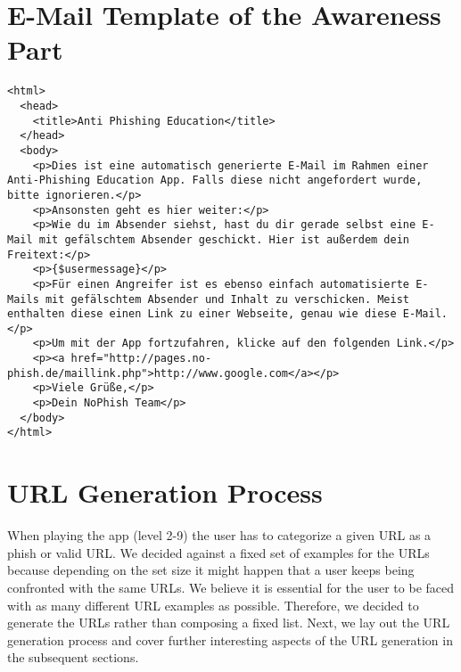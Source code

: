 \section{E-Mail Template of the Awareness Part}
\label{a:mail}
\lstset{language=html}
\begin{lstlisting}
<html>
  <head>
    <title>Anti Phishing Education</title>
  </head>
  <body>
    <p>Dies ist eine automatisch generierte E-Mail im Rahmen einer Anti-Phishing Education App. Falls diese nicht angefordert wurde, bitte ignorieren.</p>
    <p>Ansonsten geht es hier weiter:</p>
    <p>Wie du im Absender siehst, hast du dir gerade selbst eine E-Mail mit gefälschtem Absender geschickt. Hier ist außerdem dein Freitext:</p>
    <p>{$usermessage}</p>
    <p>Für einen Angreifer ist es ebenso einfach automatisierte E-Mails mit gefälschtem Absender und Inhalt zu verschicken. Meist enthalten diese einen Link zu einer Webseite, genau wie diese E-Mail.</p>
    <p>Um mit der App fortzufahren, klicke auf den folgenden Link.</p>
    <p><a href="http://pages.no-phish.de/maillink.php">http://www.google.com</a></p>
    <p>Viele Grüße,</p>
    <p>Dein NoPhish Team</p>
  </body>
</html>
\end{lstlisting}

\section{URL Generation Process}
\label{s:url_generation}
When playing the app (level 2-9) the user has to categorize a given URL as a phish or valid URL.
We decided against a fixed set of examples for the URLs because depending on the set size it might happen that a user keeps being confronted with the same URLs.
We believe it is essential for the user to be faced with as many different URL examples as possible.
Therefore, we decided to generate the URLs rather than composing a fixed list.
Next, we lay out the URL generation process and cover further interesting aspects of the URL generation in the subsequent sections.
